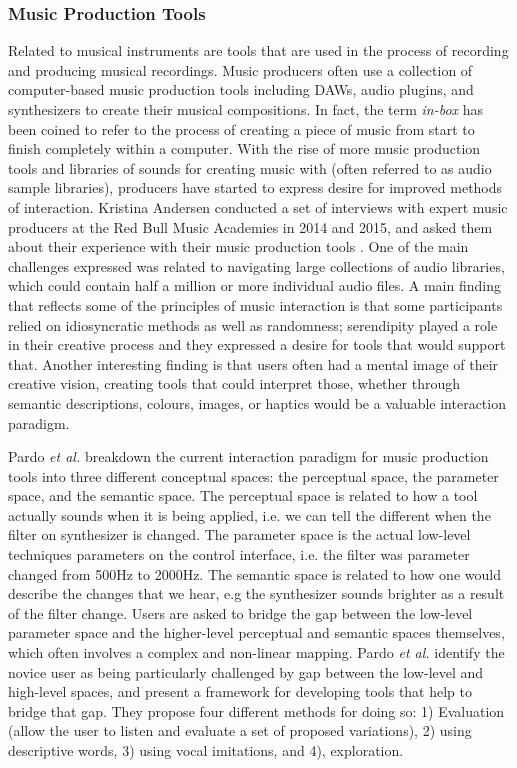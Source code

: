 \subsubsection{Music Production Tools}
Related to musical instruments are tools that are used in the process of recording and producing musical recordings. Music producers often use a collection of computer-based music production tools including DAWs, audio plugins, and synthesizers to create their musical compositions. In fact, the term \textit{in-box} has been coined to refer to the process of creating a piece of music from start to finish completely within a computer. With the rise of more music production tools and libraries of sounds for creating music with (often referred to as audio sample libraries), producers have started to express desire for improved methods of interaction. Kristina Andersen conducted a set of interviews with expert music producers at the Red Bull Music Academies in 2014 and 2015, and asked them about their experience with their music production tools \cite{andersen2016conversations}. One of the main challenges expressed was related to navigating large collections of audio libraries, which could contain half a million or more individual audio files. A main finding that reflects some of the principles of music interaction is that some participants relied on idiosyncratic methods as well as randomness; serendipity played a role in their creative process and they expressed a desire for tools that would support that. Another interesting finding is that users often had a mental image of their creative vision, creating tools that could interpret those, whether through semantic descriptions, colours, images, or haptics would be a valuable interaction paradigm. 

Pardo \textit{et al.} \cite{pardo2019learning} breakdown the current interaction paradigm for music production tools into three different conceptual spaces: the perceptual space, the parameter space, and the semantic space. The perceptual space is related to how a tool actually sounds when it is being applied, i.e. we can tell the different when the filter on synthesizer is changed. The parameter space is the actual low-level techniques parameters on the control interface, i.e. the filter was parameter changed from 500Hz to 2000Hz. The semantic space is related to how one would describe the changes that we hear, e.g the synthesizer sounds brighter as a result of the filter change. Users are asked to bridge the gap between the low-level parameter space and the higher-level perceptual and semantic spaces themselves, which often involves a complex and non-linear mapping. Pardo \textit{et al.} identify the novice user as being particularly challenged by gap between the low-level and high-level spaces, and present a framework for developing tools that help to bridge that gap. They propose four different methods for doing so: 1) Evaluation (allow the user to listen and evaluate a set of proposed variations), 2) using descriptive words, 3) using vocal imitations, and 4), exploration.

